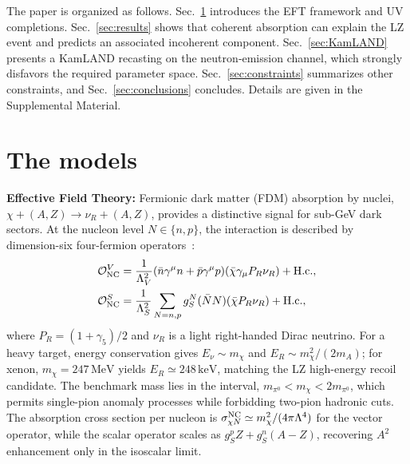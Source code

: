 \documentclass[aps,twocolumn,superscriptaddress,groupedaddress,nofootinbib,floatfix]{revtex4}
\newcommand{\MeV}{\,\mathrm{MeV}}
\newcommand{\keV}{\,\mathrm{keV}}
\begin{document}
The paper is organized as follows. Sec.~\ref{sec:fermion_model} introduces the EFT framework and UV completions. Sec.~\ref{sec:results} shows that coherent absorption can explain the LZ event and predicts an associated incoherent component. Sec.~\ref{sec:KamLAND} presents a KamLAND recasting on the neutron‑emission channel, which strongly disfavors the required parameter space. Sec.~\ref{sec:constraints} summarizes other constraints, and Sec.~\ref{sec:conclusions} concludes. Details are given in the Supplemental Material.


\section{The models}
\label{sec:fermion_model}

\textbf{Effective Field Theory:} Fermionic dark matter (FDM) absorption by nuclei, $\chi+(A,Z)\to\nu_R+(A,Z)$, provides a distinctive signal for sub-GeV dark sectors. At the nucleon level $N\in\{n,p\}$, the interaction is described by dimension-six four-fermion operators~\cite{Dror:2019onn,Dror:2019dib}:
\begin{align}
\mathcal{O}_{\rm NC}^V &= \frac{1}{\Lambda_V^2} (\bar{n}\gamma^\mu n+\bar{p}\gamma^\mu p)(\bar{\chi}\gamma_\mu P_R\nu_R)+\mathrm{H.c.}, \label{eq:V} \\
\mathcal{O}_{\rm NC}^S &= \frac{1}{\Lambda_S^2}\sum_{N=n,p}g_S^N(\bar{N}N)(\bar{\chi}P_R\nu_R)+\mathrm{H.c.}, \label{eq:S}
\end{align}
where $P_R=(1+\gamma_5)/2$ and $\nu_R$ is a light right-handed Dirac neutrino. For a heavy target, energy conservation gives $E_\nu\sim m_\chi$ and $E_R\sim m_\chi^2/(2m_A)$; for xenon, $m_\chi=247\MeV$ yields $E_R\simeq248\keV$, matching the LZ high-energy recoil candidate. The benchmark mass lies in the interval, $m_{\pi^0} < m_\chi < 2m_{\pi^0}$, which permits single-pion anomaly processes while forbidding two-pion hadronic cuts. The absorption cross section per nucleon is $\sigma_{\chi N}^{\rm NC}\simeq m_\chi^2/(4\pi\Lambda^4)$ for the vector operator, while the scalar operator scales as $g_S^pZ+g_S^n(A-Z)$, recovering $A^2$ enhancement only in the isoscalar limit.
\end{document}
